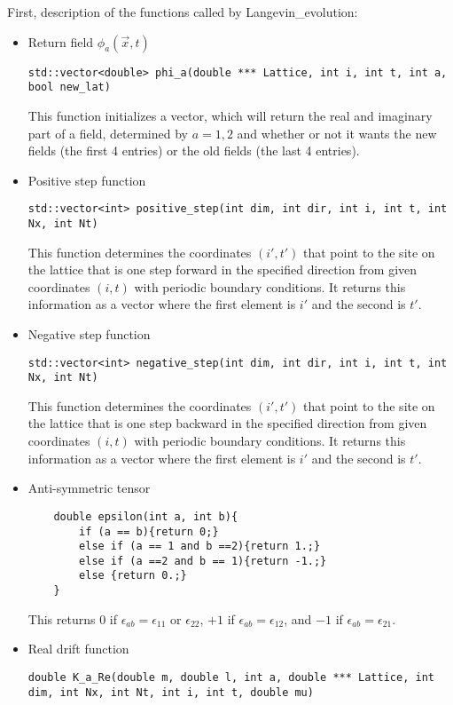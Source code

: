 \documentclass[../../RotatingBosons.tex]{subfiles}
\begin{document}
First, description of the functions called by Langevin\_evolution:
\begin{itemize}
	\item Return field $\phi_{a} (\vec{x},t)$
	
	\lstinline{std::vector<double> phi_a(double *** Lattice, int i, int t, int a, bool new_lat)}
	
	This function initializes a vector, which will return the real and imaginary part of a field, determined by $a = 1,2$ and whether or not it wants the new fields (the first 4 entries) or the old fields (the last 4 entries).	
	
	\item Positive step function
	
	 \lstinline{std::vector<int> positive_step(int dim, int dir, int i, int t, int Nx, int Nt)}
	
	This function determines the coordinates $(i',t')$ that point to the site on the lattice that is one step forward in the specified direction from given coordinates $(i,t)$ with periodic boundary conditions. It returns this information as a vector where the first element is $i'$ and the second is $t'$.
	
	\item Negative step function
	
	\lstinline{std::vector<int> negative_step(int dim, int dir, int i, int t, int Nx, int Nt)}
	
	This function determines the coordinates $(i',t')$ that point to the site on the lattice that is one step backward in the specified direction from given coordinates $(i,t)$ with periodic boundary conditions. It returns this information as a vector where the first element is $i'$ and the second is $t'$.
	
	\item Anti-symmetric tensor
	
	\begin{lstlisting}
	double epsilon(int a, int b){
		if (a == b){return 0;}
		else if (a == 1 and b ==2){return 1.;}
		else if (a ==2 and b == 1){return -1.;}
		else {return 0.;}
	}
	\end{lstlisting}
	
	This returns 0 if $\epsilon_{ab} = \epsilon_{11}$ or $\epsilon_{22}$, $+1$ if $\epsilon_{ab} = \epsilon_{12}$, and $-1$ if  $\epsilon_{ab} = \epsilon_{21}$.
	
	\item Real drift function
	
	\lstinline{double K_a_Re(double m, double l, int a, double *** Lattice, int dim, int Nx, int Nt, int i, int t, double mu)}
	

\end{itemize}
\end{document}
